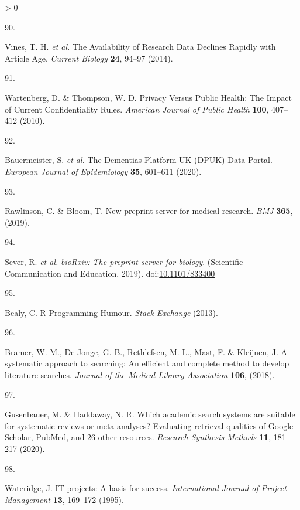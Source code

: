 \documentclass[a4paper, twoside]{templates/ociamthesis}
\newlength{\cslhangindent}
\newlength{\csllabelwidth}
\newenvironment{CSLReferences}[3] %
 {%
  \setlength{\parindent}{0pt}
  \ifodd #1 \everypar{\setlength{\hangindent}{\cslhangindent}}\ignorespaces\fi
  \ifnum #2 > 0
  \setlength{\parskip}{#2\baselineskip}
  \fi
 }%
 {}
\newcommand{\CSLLeftMargin}[1]{\parbox[t]{\maxof{\widthof{#1}}{\csllabelwidth}}{#1}}
\newcommand{\CSLRightInline}[1]{\parbox[t]{\linewidth - \csllabelwidth}{#1}}
\begin{document}
\begin{CSLReferences}{0}{0}
\leavevmode\hypertarget{ref-vines2014}{}%
\CSLLeftMargin{90. }
\CSLRightInline{Vines, T. H. \emph{et al.} The {Availability} of {Research Data Declines Rapidly} with {Article Age}. \emph{Current Biology} \textbf{24}, 94--97 (2014).}

\leavevmode\hypertarget{ref-wartenberg2010}{}%
\CSLLeftMargin{91. }
\CSLRightInline{Wartenberg, D. \& Thompson, W. D. Privacy {Versus Public Health}: {The Impact} of {Current Confidentiality Rules}. \emph{American Journal of Public Health} \textbf{100}, 407--412 (2010).}

\leavevmode\hypertarget{ref-bauermeister2020}{}%
\CSLLeftMargin{92. }
\CSLRightInline{Bauermeister, S. \emph{et al.} The {Dementias Platform UK} ({DPUK}) {Data Portal}. \emph{European Journal of Epidemiology} \textbf{35}, 601--611 (2020).}

\leavevmode\hypertarget{ref-rawlinson2019}{}%
\CSLLeftMargin{93. }
\CSLRightInline{Rawlinson, C. \& Bloom, T. New preprint server for medical research. \emph{BMJ} \textbf{365}, (2019).}

\leavevmode\hypertarget{ref-sever2019}{}%
\CSLLeftMargin{94. }
\CSLRightInline{Sever, R. \emph{et al.} \emph{{bioRxiv}: The preprint server for biology}. ({Scientific Communication and Education}, 2019). doi:\href{https://doi.org/10.1101/833400}{10.1101/833400}}

\leavevmode\hypertarget{ref-bealy2013}{}%
\CSLLeftMargin{95. }
\CSLRightInline{Bealy, C. R {Programming Humour}. \emph{Stack Exchange} (2013).}

\leavevmode\hypertarget{ref-bramer2018a}{}%
\CSLLeftMargin{96. }
\CSLRightInline{Bramer, W. M., De Jonge, G. B., Rethlefsen, M. L., Mast, F. \& Kleijnen, J. A systematic approach to searching: An efficient and complete method to develop literature searches. \emph{Journal of the Medical Library Association} \textbf{106}, (2018).}

\leavevmode\hypertarget{ref-gusenbauer2020}{}%
\CSLLeftMargin{97. }
\CSLRightInline{Gusenbauer, M. \& Haddaway, N. R. Which academic search systems are suitable for systematic reviews or meta-analyses? {Evaluating} retrieval qualities of {Google Scholar}, {PubMed}, and 26 other resources. \emph{Research Synthesis Methods} \textbf{11}, 181--217 (2020).}

\leavevmode\hypertarget{ref-wateridge1995}{}%
\CSLLeftMargin{98. }
\CSLRightInline{Wateridge, J. {IT} projects: A basis for success. \emph{International Journal of Project Management} \textbf{13}, 169--172 (1995).}


\end{CSLReferences}
\end{document}
